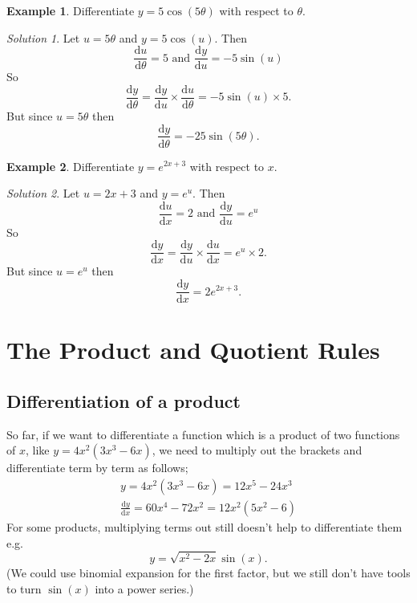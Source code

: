 \documentclass[
  english,
  11pt,
  oneside]{book}
\newcommand{\slide}{}
\theoremstyle{definition}
\theoremstyle{definition}
\newtheorem{example}{Example}[chapter]
\theoremstyle{definition}
\theoremstyle{definition}
\theoremstyle{remark}
\newtheorem*{solution}{Solution}
\begin{document}
\slide

\begin{example}
Differentiate \(y=5\cos(5\theta)\) with respect to \(\theta\).
\end{example}

\begin{solution}
Let \(u = 5\theta\) and \(y = 5\cos(u)\). Then
\[\frac{\mathrm{d} u}{{\mathrm{d} \theta}} = 5\text{ and }\frac{\mathrm{d} y}{\mathrm{d} u} = -5\sin(u)\]
So
\[\frac{\mathrm{d} y}{{\mathrm{d} \theta}} = \frac{\mathrm{d} y}{\mathrm{d} u}\times\frac{\mathrm{d} u}{{\mathrm{d} \theta}} = -5\sin(u)\times5.\]
But since \(u = 5\theta\) then
\[\frac{\mathrm{d} y}{{\mathrm{d} \theta}} = -25\sin(5\theta).\]
\end{solution}

\slide

\begin{example}
Differentiate \(y=e^{2x+3}\) with respect to \(x\).
\end{example}

\begin{solution}
Let \(u = 2x+3\) and \(y = e^u\). Then
\[\frac{\mathrm{d} u}{\mathrm{d} x} = 2\text{ and }\frac{\mathrm{d} y}{\mathrm{d} u} = e^u\]
So
\[\frac{\mathrm{d} y}{\mathrm{d} x} = \frac{\mathrm{d} y}{\mathrm{d} u}\times\frac{\mathrm{d} u}{\mathrm{d} x} = e^u\times2.\]
But since \(u = e^u\) then
\[\frac{\mathrm{d} y}{\mathrm{d} x} = 2e^{2x+3}.\]
\end{solution}

\slide

\section{The Product and Quotient Rules}\label{lecture-six}

\subsection{Differentiation of a product}\label{differentiation-of-a-product}

So far, if we want to differentiate a function which is a product of two functions of \(x\), like \(y = 4x^2(3x^3 - 6x)\), we need to multiply out the brackets and differentiate term by term as follows;
\begin{gather*}
y = 4x^2(3x^3 - 6x) = 12x^5 - 24x^3\\
\frac{\mathrm{d} y}{\mathrm{d} x} = 60x^4 - 72x^2 = 12x^2(5x^2 - 6)
\end{gather*}
For some products, multiplying terms out still doesn't help to differentiate them e.g.
\[y = \sqrt{x^2 - 2x} \sin(x).\]
(We could use binomial expansion for the first factor, but we still don't have tools to turn \(\sin(x)\) into a power series.)
\slide
\end{document}
